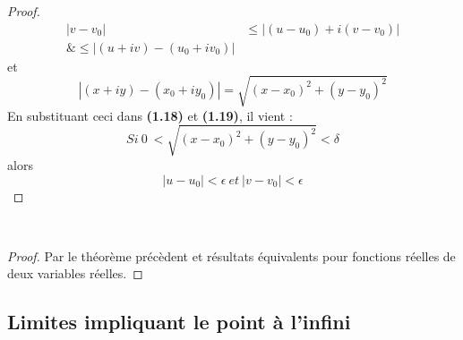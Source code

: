 \begin{proof}
	\begin{equation}
		\begin{array}{cc}
			|v-v_0| & \leq  |(u-u_0)+i(v-v_0)| \\
			\&\leq |(u+iv)-(u_0+iv_0)| &                          
		\end{array}
	\end{equation}
	et
	\begin{equation}
		|(x+iy) - (x_0+iy_0)| = \sqrt{(x-x_0)^2+(y-y_0)^2}
	\end{equation}
	En substituant ceci dans \textbf{(1.18)} et \textbf{(1.19)}, il vient :
	\begin{equation}
		Si\ 0\ < \sqrt{(x-x_0)^2+(y-y_0)^2} < \delta
	\end{equation}
	alors
	\begin{equation}
		|u-u_0| < \epsilon\ et\ |v-v_0|<\epsilon
	\end{equation}
\end{proof}
    
    
\ \\
\begin{proof}
	Par le théorème précèdent et résultats équivalents pour fonctions réelles de deux variables
	réelles.
\end{proof}
    
\subsection{Limites impliquant le point à l'infini}
